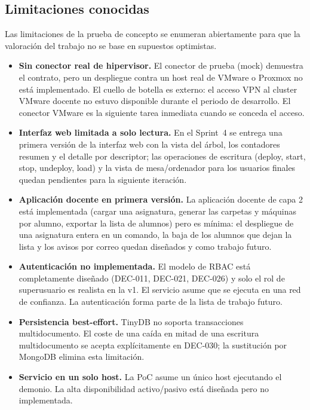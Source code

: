 \subsection{Limitaciones conocidas}

Las limitaciones de la prueba de concepto se enumeran abiertamente
para que la valoración del trabajo no se base en supuestos
optimistas.

\begin{itemize}
  \item \textbf{Sin conector real de hipervisor.} El conector de
        prueba (mock) demuestra el contrato, pero un despliegue
        contra un host real de VMware o Proxmox no está
        implementado. El cuello de botella es externo: el acceso
        VPN al cluster VMware docente no estuvo disponible durante
        el periodo de desarrollo. El conector VMware es la
        siguiente tarea inmediata cuando se conceda el acceso.
  \item \textbf{Interfaz web limitada a solo lectura.} En el
        Sprint~4 se entrega una primera versión de la interfaz web
        con la vista del árbol, los contadores resumen y el detalle
        por descriptor; las operaciones de escritura (deploy, start,
        stop, undeploy, load) y la vista de mesa/ordenador para los
        usuarios finales quedan pendientes para la siguiente
        iteración.
  \item \textbf{Aplicación docente en primera versión.} La aplicación
        docente de capa 2 está implementada (cargar una asignatura,
        generar las carpetas y máquinas por alumno, exportar la lista
        de alumnos) pero es mínima: el despliegue de una asignatura
        entera en un comando, la baja de los alumnos que dejan la
        lista y los avisos por correo quedan diseñados y como trabajo
        futuro.
  \item \textbf{Autenticación no implementada.} El modelo de RBAC
        está completamente diseñado (DEC-011, DEC-021, DEC-026) y
        solo el rol de superusuario es realista en la v1. El
        servicio asume que se ejecuta en una red de confianza. La
        autenticación forma parte de la lista de trabajo futuro.
  \item \textbf{Persistencia best-effort.} TinyDB no soporta
        transacciones multidocumento. El coste de una caída en
        mitad de una escritura multidocumento se acepta
        explícitamente en DEC-030; la sustitución por MongoDB
        elimina esta limitación.
  \item \textbf{Servicio en un solo host.} La PoC asume un único
        host ejecutando el demonio. La alta disponibilidad
        activo/pasivo está diseñada pero no implementada.
\end{itemize}

